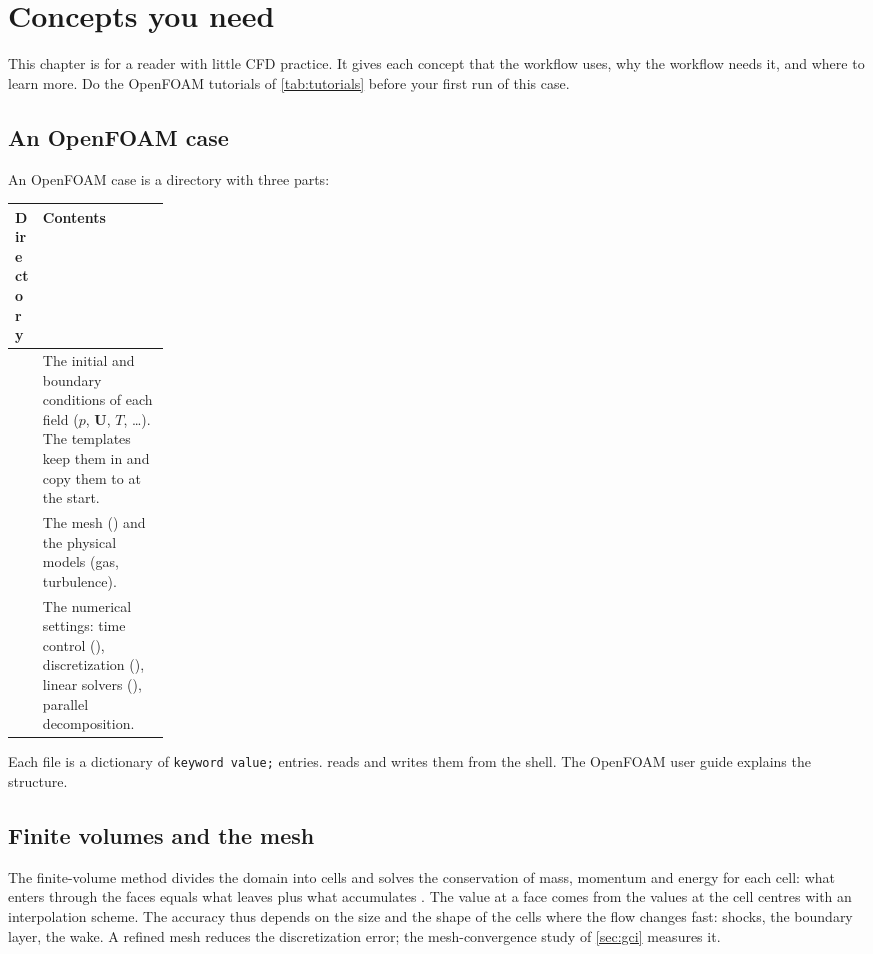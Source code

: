 \chapter{Concepts you need}\label{ch:concepts}

This chapter is for a reader with little CFD practice. It gives each concept that the
workflow uses, why the workflow needs it, and where to learn more. Do the OpenFOAM
tutorials of \cref{tab:tutorials} before your first run of this case.

\section{An OpenFOAM case}

An OpenFOAM case is a directory with three parts:

\begin{tabularx}{\linewidth}{@{}P{0.18\linewidth} L@{}}
\toprule
Directory & Contents \\
\midrule
{} & The initial and boundary conditions of each field ($p$, $\mathbf{U}$, $T$, \ldots). The templates keep them in  and copy them to  at the start. \\
 & The mesh () and the physical models (gas, turbulence). \\
 & The numerical settings: time control (), discretization (), linear solvers (), parallel decomposition. \\
\bottomrule
\end{tabularx}

\medskip
Each file is a dictionary of \texttt{keyword value;} entries. 
reads and writes them from the shell. The OpenFOAM user guide explains the structure.

\section{Finite volumes and the mesh}

The finite-volume method divides the domain into cells and solves the conservation of
mass, momentum and energy for each cell: what enters through the faces equals what
leaves plus what accumulates \citep{versteeg2007,moukalled2016}. The value at a face
comes from the values at the cell centres with an interpolation scheme. The accuracy
thus depends on the size and the shape of the cells where the flow changes fast:
shocks, the boundary layer, the wake. A refined mesh reduces the discretization error;
the mesh-convergence study of \cref{sec:gci} measures it.

